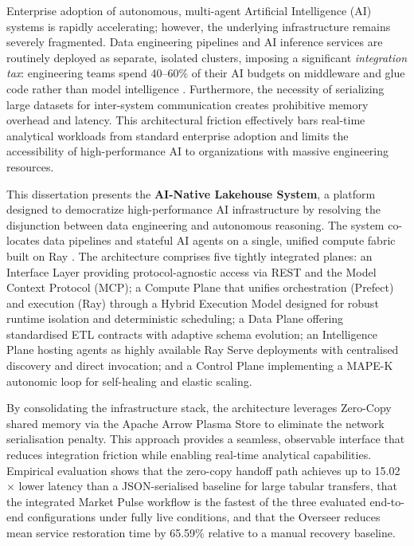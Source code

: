 \documentclass[12pt, a4paper]{report}
\begin{document}
Enterprise adoption of autonomous, multi-agent Artificial Intelligence (AI) systems is rapidly accelerating; however, the underlying infrastructure remains severely fragmented. Data engineering pipelines and AI inference services are routinely deployed as separate, isolated clusters, imposing a significant \emph{integration tax}: engineering teams spend 40--60\% of their AI budgets on middleware and glue code rather than model intelligence \citep{mckinsey2024}. Furthermore, the necessity of serializing large datasets for inter-system communication creates prohibitive memory overhead and latency. This architectural friction effectively bars real-time analytical workloads from standard enterprise adoption and limits the accessibility of high-performance AI to organizations with massive engineering resources.

This dissertation presents the \textbf{AI-Native Lakehouse System}, a platform designed to democratize high-performance AI infrastructure by resolving the disjunction between data engineering and autonomous reasoning. The system co-locates data pipelines and stateful AI agents on a single, unified compute fabric built on Ray \citep{moritz2018ray}. The architecture comprises five tightly integrated planes: an Interface Layer providing protocol-agnostic access via REST and the Model Context Protocol (MCP); a Compute Plane that unifies orchestration (Prefect) and execution (Ray) through a Hybrid Execution Model designed for robust runtime isolation and deterministic scheduling; a Data Plane offering standardised ETL contracts with adaptive schema evolution; an Intelligence Plane hosting agents as highly available Ray Serve deployments with centralised discovery and direct invocation; and a Control Plane implementing a MAPE-K autonomic loop \citep{kephart2003} for self-healing and elastic scaling.

By consolidating the infrastructure stack, the architecture leverages Zero-Copy shared memory via the Apache Arrow Plasma Store to eliminate the network serialisation penalty. This approach provides a seamless, observable interface that reduces integration friction while enabling real-time analytical capabilities. Empirical evaluation shows that the zero-copy handoff path achieves up to 15.02$\times$ lower latency than a JSON-serialised baseline for large tabular transfers, that the integrated Market Pulse workflow is the fastest of the three evaluated end-to-end configurations under fully live conditions, and that the Overseer reduces mean service restoration time by 65.59\% relative to a manual recovery baseline.
\end{document}
